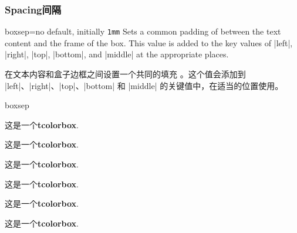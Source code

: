 \subsubsection{Spacing\hfill 间隔}
\begin{docTcbKey}{boxsep}{=}{no default, initially \texttt{1mm}}
Sets a common padding of  between the text content and the
frame of the box. This value is added to the key values of
|left|, |right|, |top|, |bottom|, and |middle| at the appropriate places.


在文本内容和盒子边框之间设置一个共同的填充 。这个值会添加到 |left|、|right|、|top|、|bottom| 和 |middle| 的关键值中，在适当的位置使用。
\begin{exdispExample}{boxsep}

\begin{tcolorbox}
这是一个\textbf{tcolorbox}.
\end{tcolorbox}
\begin{tcolorbox}[draft]
这是一个\textbf{tcolorbox}.
\end{tcolorbox}

\begin{tcolorbox}[boxsep=0mm]
这是一个\textbf{tcolorbox}.
\end{tcolorbox}
\begin{tcolorbox}[boxsep=0mm,draft]
这是一个\textbf{tcolorbox}.
\end{tcolorbox}

\begin{tcolorbox}[boxsep=5mm]
这是一个\textbf{tcolorbox}.
\end{tcolorbox}
\begin{tcolorbox}[boxsep=5mm,draft]
这是一个\textbf{tcolorbox}.
\end{tcolorbox}
\end{exdispExample}
\end{docTcbKey}


